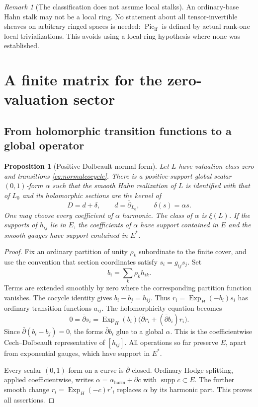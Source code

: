 \documentclass[11pt,letterpaper]{article}
\numberwithin{equation}{section}
\newtheorem{proposition}[theorem]{Proposition}
\theoremstyle{definition}
\theoremstyle{remark}
\newtheorem{remark}[theorem]{Remark}
\newcommand{\supp}{\operatorname{supp}}
\newcommand{\Piclf}{\operatorname{Pic}_{\mathrm{lf}}}
\newcommand{\Exp}{\operatorname{Exp}_{H}}
\newcommand{\db}{\bar\partial}
\begin{document}
\begin{remark}[The classification does not assume local stalks]
An ordinary-base Hahn stalk may not be a local ring. No statement about
all tensor-invertible sheaves on arbitrary ringed spaces is needed:
$\Piclf$ is defined by actual rank-one local trivializations. This
avoids using a local-ring hypothesis where none was established.
\end{remark}

\section{A finite matrix for the zero-valuation sector}
\label{sec:matrix}

\subsection{From holomorphic transition functions to a global operator}
\begin{proposition}[Positive Dolbeault normal form]
\label{prop:normalform}
Let $L$ have valuation class zero and transitions
\eqref{eq:normalcocycle}. There is a positive-support global scalar
$(0,1)$-form $\alpha$ such that the smooth Hahn realization of $L$ is
identified with that of $L_0$ and its holomorphic sections are the kernel
of
\begin{equation}
 D=d+\delta,\qquad d=\db_{L_0},\qquad
 \delta(s)=\alpha s.
 \label{eq:D}
\end{equation}
One may choose every coefficient of $\alpha$ harmonic. The class of
$\alpha$ is $\xi(L)$. If the supports of $h_{ij}$ lie in $E$, the
coefficients of $\alpha$ have support contained in $E$ and the smooth
gauges have support contained in $E^*$.
\end{proposition}
\begin{proof}
Fix an ordinary partition of unity $\rho_k$ subordinate to the finite
cover, and use the convention that section coordinates satisfy
$s_i=g_{ij}s_j$. Set
\[
 b_i=\sum_k\rho_k h_{ik}.
\]
Terms are extended smoothly by zero where the corresponding partition
function vanishes. The cocycle identity gives $b_i-b_j=h_{ij}$.
Thus $r_i=\Exp(-b_i)s_i$ has ordinary transition functions $a_{ij}$.
The holomorphicity equation becomes
\[
 0=\db s_i=\Exp(b_i)\bigl(\db r_i+(\db b_i)r_i\bigr).
\]
Since $\db(b_i-b_j)=0$, the forms $\db b_i$ glue to a global $\alpha$.
This is the coefficientwise Cech--Dolbeault representative of $[h_{ij}]$.
All operations so far preserve $E$, apart from exponential gauges,
which have support in $E^*$.

Every scalar $(0,1)$-form on a curve is $\db$-closed. Ordinary Hodge
splitting, applied coefficientwise, writes
$\alpha=\alpha_{\mathrm{harm}}+\db c$ with $\supp c\subset E$.
The further smooth change $r_i=\Exp(-c)r'_i$ replaces $\alpha$ by its
harmonic part. This proves all assertions.
\end{proof}
\end{document}
